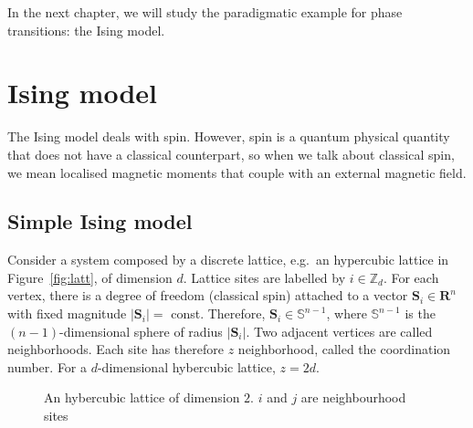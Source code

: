     In the next chapter, we will study the paradigmatic example for phase transitions: the Ising model.

\chapter{Ising model}

    The Ising model deals with spin. However, spin is a quantum physical quantity that does not have a classical counterpart, so when we talk about classical spin, we mean localised magnetic moments that couple with an external magnetic field. 

\section{Simple Ising model}
    
    Consider a system composed by a discrete lattice, e.g.~an hypercubic lattice in Figure~\eqref{fig:latt}, of dimension $d$. Lattice sites are labelled by $i \in \mathbb Z_d$. For each vertex,  there is a degree of freedom (classical spin) attached to a vector $\mathbf S_i \in \mathbf R^n$ with fixed magnitude $|\mathbf S_i| = $ const. Therefore, $\mathbf S_i \in \mathbb S^{n-1}$, where $\mathbb S^{n-1}$ is the $(n-1)$-dimensional sphere of radius $|\mathbf S_i|$. Two adjacent vertices are called neighborhoods. Each site has therefore $z$ neighborhood, called the coordination number. For a $d$-dimensional hybercubic lattice, $z = 2 d$. 

    \begin{figure}[h!]
        \centering
        \caption{An hybercubic lattice of dimension $2$. $i$ and $j$ are neighbourhood sites}
        \label{fig:latt}
    \end{figure}

